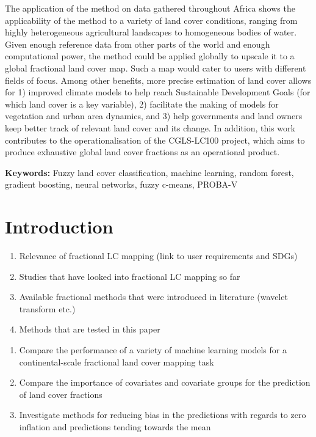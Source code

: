\documentclass[a4paper,10pt]{article}
\newcommand{\minisection}[1]{\medskip \textbf{#1:}}
\begin{document}
{The application of the method on data gathered throughout Africa shows the applicability of the method to a variety of land cover conditions, ranging from highly heterogeneous agricultural landscapes to homogeneous bodies of water. Given enough reference data from other parts of the world and enough computational power, the method could be applied globally to upscale it to a global fractional land cover map. Such a map would cater to users with different fields of focus. Among other benefits, more precise estimation of land cover allows for 1) improved climate models to help reach Sustainable Development Goals (for which land cover is a key variable), 2) facilitate the making of models for vegetation and urban area dynamics, and 3) help governments and land owners keep better track of relevant land cover and its change. In addition, this work contributes to the operationalisation of the CGLS-LC100 project, which aims to produce exhaustive global land cover fractions as an operational product.

\minisection{Keywords} Fuzzy land cover classification, machine learning, random forest, gradient boosting, neural networks, fuzzy c-means, PROBA-V
}

\section{Introduction}

\begin{enumerate}
 \item Relevance of fractional LC mapping (link to user requirements and SDGs)
 \item Studies that have looked into fractional LC mapping so far
 \item Available fractional methods that were introduced in literature (wavelet transform etc.)
 \item Methods that are tested in this paper
\end{enumerate}


\begin{enumerate}
 \item Compare the performance of a variety of machine learning models for a continental-scale fractional land cover mapping task
 \item Compare the importance of covariates and covariate groups for the prediction of land cover fractions
 \item Investigate methods for reducing bias in the predictions with regards to zero inflation and predictions tending towards the mean
\end{enumerate}
\end{document}
